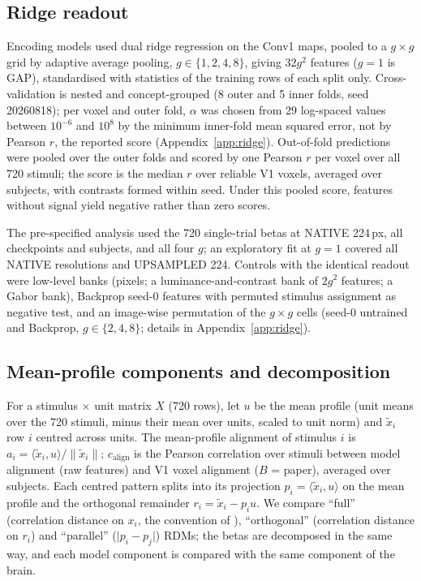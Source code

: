 \subsection{Ridge readout}
\label{sec:ridge}

Encoding models used dual ridge regression \citep{hoerl1970} on the Conv1 maps, pooled to a
$g \times g$ grid by adaptive average pooling, $g \in \{1, 2, 4, 8\}$, giving $32g^2$ features
($g = 1$ is GAP), standardised with statistics of the training rows of each split only.
Cross-validation is nested and concept-grouped (8 outer and 5 inner folds, seed 20260818); per
voxel and outer fold, $\alpha$ was chosen from 29 log-spaced values between $10^{-6}$ and $10^{8}$
by the minimum inner-fold mean squared error, not by Pearson $r$, the reported score
(Appendix~\ref{app:ridge}). Out-of-fold predictions were pooled over the outer folds and scored by
one Pearson $r$ per voxel over all 720 stimuli; the score is the median $r$ over reliable V1 voxels,
averaged over subjects, with contrasts formed within seed. Under this pooled score, features
without signal yield negative rather than zero scores.

The pre-specified analysis used the 720 single-trial betas at NATIVE 224\,px, all checkpoints and
subjects, and all four $g$; an exploratory fit at $g = 1$ covered all NATIVE resolutions and
UPSAMPLED 224. Controls with the identical readout were low-level banks (pixels; a
luminance-and-contrast bank of $2g^2$ features; a Gabor bank), Backprop seed-0 features with
permuted stimulus assignment as negative test, and an image-wise permutation of the $g \times g$
cells (seed-0 untrained and Backprop, $g \in \{2, 4, 8\}$; details in Appendix~\ref{app:ridge}).

\subsection{Mean-profile components and decomposition}
\label{sec:gainmethods}

For a stimulus $\times$ unit matrix $X$ (720 rows), let $u$ be the mean profile (unit means over
the 720 stimuli, minus their mean over units, scaled to unit norm) and $\tilde{x}_i$ row $i$
centred across units. The mean-profile alignment of stimulus $i$ is
$a_i = \langle \tilde{x}_i, u \rangle / \lVert \tilde{x}_i \rVert$; $c_{\mathrm{align}}$ is the
Pearson correlation over stimuli between model alignment (raw features) and V1 voxel alignment
($B$ = paper), averaged over subjects. Each centred pattern splits into its projection
$p_i = \langle \tilde{x}_i, u \rangle$ on the mean profile and the orthogonal remainder
$r_i = \tilde{x}_i - p_i u$. We compare ``full'' (correlation distance on $x_i$, the convention of
\citet{evalres}), ``orthogonal'' (correlation distance on $r_i$) and ``parallel''
($\lvert p_i - p_j \rvert$) RDMs; the betas are decomposed in the same way, and each model
component is compared with the same component of the brain.

